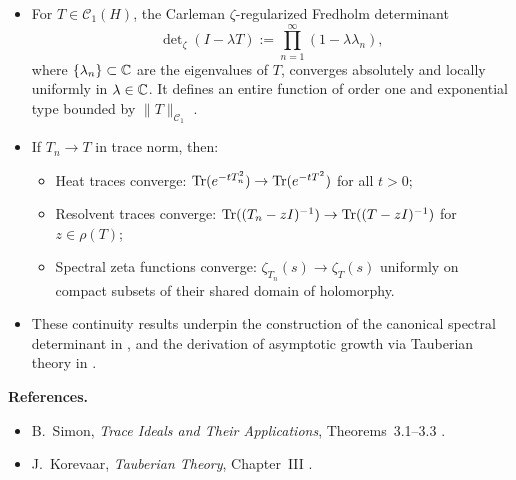 \begin{definition}
\begin{itemize}
    \item For \( T \in \mathcal{C}_1(H) \), the Carleman \(\zeta\)-regularized Fredholm determinant
    \[
    \det\nolimits_{\zeta}(I - \lambda T) := \prod_{n=1}^\infty (1 - \lambda \lambda_n),
    \]
    where \( \{\lambda_n\} \subset \mathbb{C} \) are the eigenvalues of \( T \), converges absolutely and locally uniformly in \( \lambda \in \mathbb{C} \). It defines an entire function of order one and exponential type bounded by \( \|T\|_{\mathcal{C}_1} \) \cite[Thm.~3.1]{Simon2005TraceIdeals}.

    \item If \( T_n \to T \) in trace norm, then:
    \begin{itemize}
        \item Heat traces converge: \( \operatorname{Tr}(e^{-t T_n^2}) \to \operatorname{Tr}(e^{-t T^2}) \) for all \( t > 0 \);
        \item Resolvent traces converge: \( \operatorname{Tr}((T_n - zI)^{-1}) \to \operatorname{Tr}((T - zI)^{-1}) \) for \( z \in \rho(T) \);
        \item Spectral zeta functions converge: \( \zeta_{T_n}(s) \to \zeta_T(s) \) uniformly on compact subsets of their shared domain of holomorphy.
    \end{itemize}

    \item These continuity results underpin the construction of the canonical spectral determinant in , and the derivation of asymptotic growth via Tauberian theory in  \cite{Korevaar2004Tauberian}.
\end{itemize}

\medskip
\noindent\textbf{References.}
\begin{itemize}
    \item B.~Simon, \emph{Trace Ideals and Their Applications}, Theorems~3.1--3.3 \cite{Simon2005TraceIdeals}.
    \item J.~Korevaar, \emph{Tauberian Theory}, Chapter~III \cite{Korevaar2004Tauberian}.
\end{itemize}
\end{definition}
